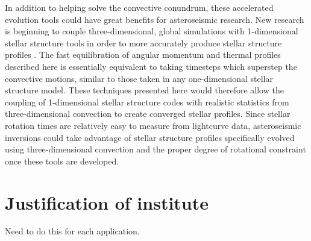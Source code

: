 \documentclass[aasms,12pt]{article}
\begin{document}
In addition to helping solve the convective conundrum, these accelerated evolution tools could have great benefits for asteroseismic research.
New research is beginning to couple three-dimensional, global simulations with 1-dimensional stellar structure tools in order to more accurately produce stellar structure profiles \citep{jorgensen&weiss2019}.
The fast equilibration of angular momentum and thermal profiles described here is essentially equivalent to taking timesteps which superstep the convective motions, similar to those taken in any one-dimensional stellar structure model.
These techniques presented here would therefore allow the coupling of 1-dimensional stellar structure codes with realistic statistics from three-dimensional convection to create converged stellar profiles.
Since stellar rotation times are relatively easy to measure from lightcurve data, asteroseismic inversions could take advantage of stellar structure profiles specifically evolved using three-dimensional convection and the proper degree of rotational constraint once these tools are developed.


\section{Justification of institute}
Need to do this for each application.



\end{document}
